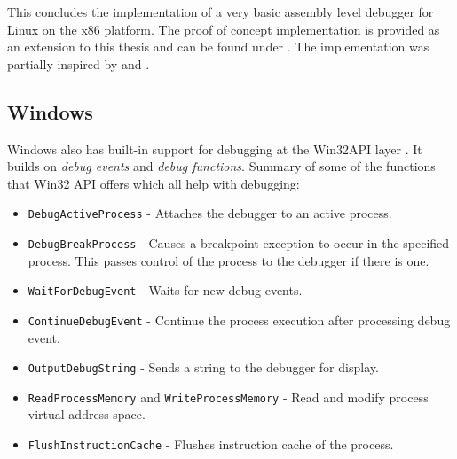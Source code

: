 This concludes the implementation of a very basic assembly level debugger for
Linux on the x86 platform. The proof of concept implementation is provided as
an extension to this thesis and can be found under . The implementation was partially inspired by
\cite{linux-debugger-blog} and \cite{lldb}.


\subsection{Windows}
Windows also has built-in support for debugging at the Win32API layer
\cite{windows-msdn-debugging-api, windows-press-debugging-api}. It builds on
\textit{debug events} and \textit{debug functions}. Summary of some of the
functions that Win32 API offers which all help with debugging:

\begin{itemize}
    \item \texttt{DebugActiveProcess} - Attaches the debugger to an
        active process.
    \item \texttt{DebugBreakProcess} - Causes a breakpoint exception to
        occur in the specified process. This passes control of the process to
        the debugger if there is one.
    \item \texttt{WaitForDebugEvent} - Waits for new debug events.
    \item \texttt{ContinueDebugEvent} - Continue the process execution
        after processing debug event.
    \item \texttt{OutputDebugString} - Sends a string to the debugger
        for display.
    \item \texttt{ReadProcessMemory} and
        \texttt{WriteProcessMemory} - Read and modify
          process virtual address space.
    \item \texttt{FlushInstructionCache} - Flushes instruction cache of
        the process.
\end{itemize}

